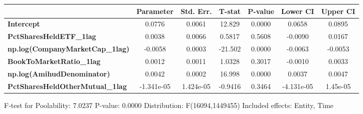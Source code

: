 \begin{center}
\begin{tabular}{lclc}
\bottomrule
\end{tabular}
\begin{tabular}{lcccccc}
                                        & \textbf{Parameter} & \textbf{Std. Err.} & \textbf{T-stat} & \textbf{P-value} & \textbf{Lower CI} & \textbf{Upper CI}  \\
\midrule
\textbf{Intercept}                      &       0.0776       &       0.0061       &      12.829     &      0.0000      &       0.0658      &       0.0895       \\
\textbf{PctSharesHeldETF\_1lag}         &       0.0038       &       0.0066       &      0.5817     &      0.5608      &      -0.0090      &       0.0167       \\
\textbf{np.log(CompanyMarketCap\_1lag)} &      -0.0058       &       0.0003       &     -21.502     &      0.0000      &      -0.0063      &      -0.0053       \\
\textbf{BookToMarketRatio\_1lag}        &       0.0012       &       0.0011       &      1.0328     &      0.3017      &      -0.0010      &       0.0033       \\
\textbf{np.log(AmihudDenominator)}      &       0.0042       &       0.0002       &      16.998     &      0.0000      &       0.0037      &       0.0047       \\
\textbf{PctSharesHeldOtherMutual\_1lag} &     -1.341e-05     &     1.424e-05      &     -0.9416     &      0.3464      &     -4.131e-05    &      1.45e-05      \\
\bottomrule
\end{tabular}
\end{center}

F-test for Poolability: 7.0237 \newline
 P-value: 0.0000 \newline
 Distribution: F(16094,1449455) \newline
  \newline
 Included effects: Entity, Time
